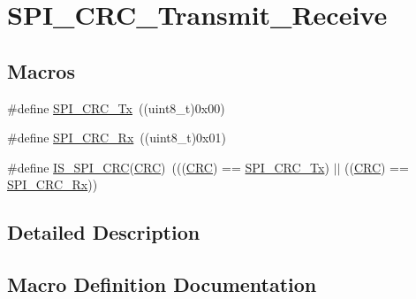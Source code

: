 \hypertarget{group___s_p_i___c_r_c___transmit___receive}{}\section{S\+P\+I\+\_\+\+C\+R\+C\+\_\+\+Transmit\+\_\+\+Receive}
\label{group___s_p_i___c_r_c___transmit___receive}
\subsection*{Macros}
\begin{DoxyCompactItemize}
\item 
\#define \mbox{\hyperlink{group___s_p_i___c_r_c___transmit___receive_ga7b5cd97c9323e491b628fd3a7be9e133}{S\+P\+I\+\_\+\+C\+R\+C\+\_\+\+Tx}}~((uint8\+\_\+t)0x00)
\item 
\#define \mbox{\hyperlink{group___s_p_i___c_r_c___transmit___receive_gaf68380273616efbbc2dc9a420f1c641b}{S\+P\+I\+\_\+\+C\+R\+C\+\_\+\+Rx}}~((uint8\+\_\+t)0x01)
\item 
\#define \mbox{\hyperlink{group___s_p_i___c_r_c___transmit___receive_ga31fe242594f851558496a93f85def883}{I\+S\+\_\+\+S\+P\+I\+\_\+\+C\+RC}}(\mbox{\hyperlink{group___peripheral__declaration_ga4381bb54c2dbc34500521165aa7b89b1}{C\+RC}})~(((\mbox{\hyperlink{group___peripheral__declaration_ga4381bb54c2dbc34500521165aa7b89b1}{C\+RC}}) == \mbox{\hyperlink{group___s_p_i___c_r_c___transmit___receive_ga7b5cd97c9323e491b628fd3a7be9e133}{S\+P\+I\+\_\+\+C\+R\+C\+\_\+\+Tx}}) $\vert$$\vert$ ((\mbox{\hyperlink{group___peripheral__declaration_ga4381bb54c2dbc34500521165aa7b89b1}{C\+RC}}) == \mbox{\hyperlink{group___s_p_i___c_r_c___transmit___receive_gaf68380273616efbbc2dc9a420f1c641b}{S\+P\+I\+\_\+\+C\+R\+C\+\_\+\+Rx}}))
\end{DoxyCompactItemize}


\subsection{Detailed Description}


\subsection{Macro Definition Documentation}
\mbox{\label{group___s_p_i___c_r_c___transmit___receive_ga31fe242594f851558496a93f85def883}} 
